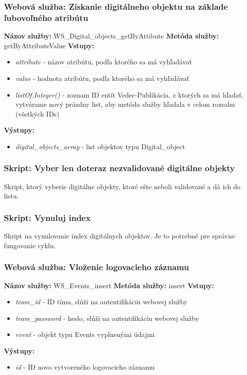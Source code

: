 \documentclass[10pt,oneside,slovak,a4paper]{article}
\begin{document}
\subsubsection{Webová služba: Získanie digitálneho objektu na základe ľubovoľného atribútu}
\textbf{Názov služby:} WS\_Digital\_objects\_getByAttibute
\textbf{Metóda služby:} getByAttributeValue
\textbf{Vstupy:}
	\begin{itemize}
		\item \textit{attribute} - názov atribútu, podľa ktorého sa má vyhľadávať
		\item \textit{value} - hodnota atribútu, podľa ktorého sa má vyhľadávať
		\item \textit{listOf.Integer()} - zoznam ID entít Vedec-Publikácia, z ktorých sa má hľadať, vytvárame nový prázdny list, aby metóda služby hľadala v celom rozsahu (všetkých IDs)
	\end{itemize}
\textbf{Výstupy:}
	\begin{itemize}
		\item \textit{digital\_objects\_array} - list objektov typu Digital\_object
	\end{itemize}
	
\subsubsection{Skript: Vyber len doteraz nezvalidované digitálne objekty}
Skript, ktorý vyberie digitálne objekty, ktoré ešte neboli validované a dá ich do listu.

\subsubsection{Skript: Vynuluj index}
Skript na vynulovanie index digitálnych objektov. Je to potrebné pre správne fungovanie cyklu.

\subsubsection{Webová služba: Vloženie logovacieho záznamu}
\textbf{Názov služby:} WS\_Events\_insert
\textbf{Metóda služby:} insert
\textbf{Vstupy:}
	\begin{itemize}
		\item \textit{team\_id} - ID tímu, slúži na autentifikáciu webovej služby
		\item \textit{team\_password} - heslo, slúži na autentifikáciu webovej služby
		\item \textit{event} - objekt typu Events vyplnenými údajmi
	\end{itemize}
\textbf{Výstupy:}
	\begin{itemize}
		\item \textit{id} - ID novo vytvoreného logovacieho záznamu
	\end{itemize}
	
\end{document}
